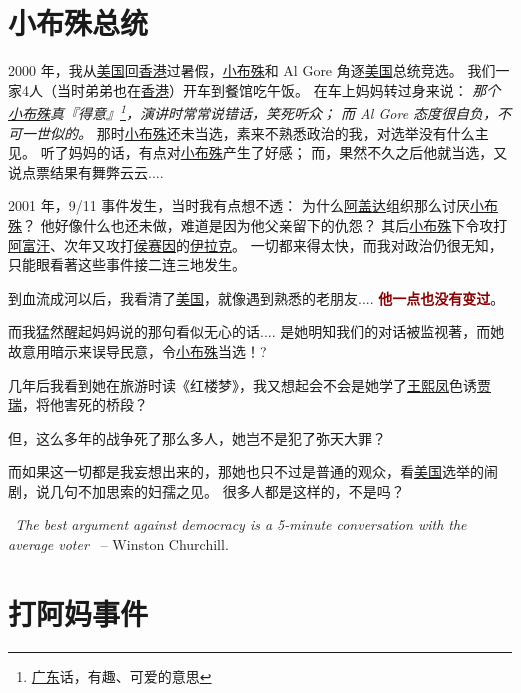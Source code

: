 \documentclass[12pt]{report}
\newcommand{\cc}[2]{#1}
\newcommand{\cc}[2]{#2}
\newcommand{\speechEn}[1]{\textrm{\textit{\ #1\ }}}
\newcommand{\speechCn}[1]{\textrm{\textit{\textcolor{Speech}{#1}}}}
\renewcommand{\em}[1]{\textbf{\textcolor{DarkRed}{#1}}}
\begin{document}
\chapter{\cc{小布殊总统}{President Bush Jr}}

\cc{
2000 年，我从\uline{美国}回\uline{香港}过暑假，\uline{小布殊}和 Al Gore 角逐\uline{美国}总统竞选。  我们一家4人（当时弟弟也在\uline{香港}）开车到餐馆吃午饭。  在车上妈妈转过身来说： \speechCn{那个\uline{小布殊}真『得意』\footnote{\uline{广东}话，有趣、可爱的意思}，演讲时常常说错话，笑死听众； 而 Al Gore 态度很自负，不可一世似的。}  那时\uline{小布殊}还未当选，素来不熟悉政治的我，对选举没有什么主见。 听了妈妈的话，有点对\uline{小布殊}产生了好感； 而，果然不久之后他就当选，又说点票结果有舞弊云云....
}{
	
}

\cc{
2001 年，9/11 事件发生，当时我有点想不透： 为什么\uline{阿盖达}组织那么讨厌\uline{小布殊}？ 他好像什么也还未做，难道是因为他父亲留下的仇怨？ 其后\uline{小布殊}下令攻打\uline{阿富汗}、次年又攻打\uline{侯赛因}的\uline{伊拉克}。 一切都来得太快，而我对政治仍很无知，只能眼看著这些事件接二连三地发生。
}{
	
}

\cc{
到血流成河以后，我看清了\uline{美国}，就像遇到熟悉的老朋友.... \em{他一点也没有变过}。
}{
	
}

\cc{
而我猛然醒起妈妈说的那句看似无心的话.... 是她明知我们的对话被监视著，而她故意用暗示来误导民意，令\uline{小布殊}当选！?
}{
	
}

\cc{
几年后我看到她在旅游时读《红楼梦》，我又想起会不会是她学了\uline{王熙凤}色诱\uline{贾瑞}，将他害死的桥段？
}{
	
}

\cc{
但，这么多年的战争死了那么多人，她岂不是犯了弥天大罪？
}{
	
}

\cc{
而如果这一切都是我妄想出来的，那她也只不过是普通的观众，看\uline{美国}选举的闹剧，说几句不加思索的妇孺之见。 很多人都是这样的，不是吗？
}{
	
}

\speechEn{The best argument against democracy is a 5-minute conversation with the average voter} -- Winston Churchill.

\chapter{\cc{打阿妈事件}{Hitting my mom}}
\end{document}
